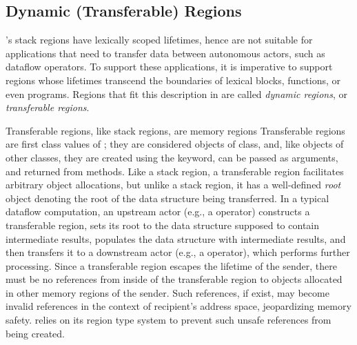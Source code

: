 \subsection{Dynamic (Transferable) Regions}

\name's stack regions have lexically scoped lifetimes, hence are not
suitable for applications that need to transfer data between
autonomous actors, such as \naiad dataflow operators. To support these
applications, it is imperative to support regions whose lifetimes
transcend the boundaries of lexical blocks, functions, or even
programs. Regions that fit this description in \name are called
\emph{dynamic regions}, or \emph{transferable regions}. 

Transferable regions, like stack regions, are memory regions
Transferable regions are first class values of \name; they are
considered objects of  class, and, like objects of other
classes, they are created using the  keyword, can be passed as
arguments, and returned from methods. Like a stack region, a
transferable region facilitates arbitrary object allocations, but
unlike a stack region, it has a well-defined \emph{root} object
denoting the root of the data structure being transferred. In a
typical dataflow computation, an upstream actor (e.g., a 
operator) constructs a transferable region, sets its root to the data
structure supposed to contain intermediate results, populates the data
structure with intermediate results, and then transfers it to a
downstream actor (e.g., a  operator), which performs further
processing. Since a transferable region escapes the lifetime of the
sender, there must be no references from inside of the transferable
region to objects allocated in other memory regions of the sender.
Such references, if exist, may become invalid references in the
context of recipient's address space, jeopardizing memory safety.
\name relies on its region type system to prevent such unsafe
references from being created.

